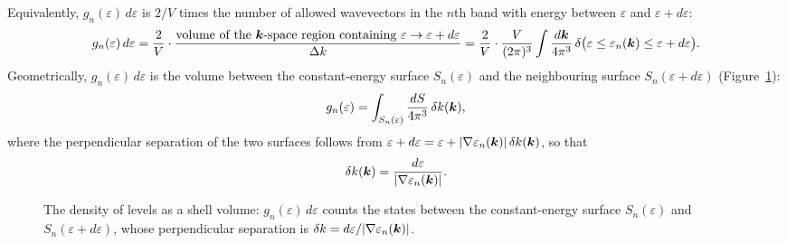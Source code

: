Equivalently, $g_n(\varepsilon)\,d\varepsilon$ is $2/V$ times the number of allowed wavevectors in the $n$th band with energy between $\varepsilon$ and $\varepsilon+d\varepsilon$:
\begin{equation}
    g_n(\varepsilon)\, d\varepsilon
    = \frac{2}{V}\cdot\frac{\text{volume of the $\bm{k}$-space region containing } \varepsilon \to \varepsilon+d\varepsilon}{\Delta k}
    = \frac{2}{V}\cdot\frac{V}{(2\pi)^3}\int \frac{d\bm{k}}{4\pi^3}\,\delta\bigl(\varepsilon \leq \varepsilon_n(\bm{k}) \leq \varepsilon+d\varepsilon\bigr).
\end{equation}
Geometrically, $g_n(\varepsilon)\,d\varepsilon$ is the volume between the constant-energy surface $S_n(\varepsilon)$ and the neighbouring surface $S_n(\varepsilon+d\varepsilon)$ (Figure~\ref{fig:bloch-dos-shell}):
\begin{equation}
    g_n(\varepsilon) = \int_{S_n(\varepsilon)} \frac{dS}{4\pi^3}\, \delta k(\bm{k}),
\end{equation}
where the perpendicular separation of the two surfaces follows from $\varepsilon + d\varepsilon = \varepsilon + |\nabla\varepsilon_n(\bm{k})|\,\delta k(\bm{k})$, so that
\begin{equation}
    \delta k(\bm{k}) = \frac{d\varepsilon}{|\nabla\varepsilon_n(\bm{k})|}.
\end{equation}

\begin{figure}[ht]
\centering
{}
\caption{The density of levels as a shell volume: $g_n(\varepsilon)\,d\varepsilon$ counts the states between the constant-energy surface $S_n(\varepsilon)$ and $S_n(\varepsilon+d\varepsilon)$, whose perpendicular separation is $\delta k = d\varepsilon/|\nabla\varepsilon_n(\bm{k})|$.}
\label{fig:bloch-dos-shell}
\end{figure}


